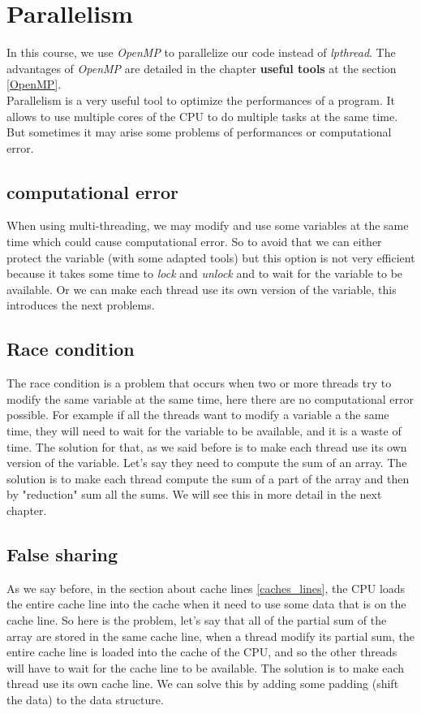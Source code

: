 \documentclass[12pt, openany]{report}
\theoremstyle{definition}
\begin{document}
\section{Parallelism}
In this course, we use \textit{OpenMP} to parallelize our code instead of \textit{lpthread}. The advantages of \textit{OpenMP} are detailed in the chapter \textbf{useful tools} at the section \ref{OpenMP}.\\ 
Parallelism is a very useful tool to optimize the performances of a program. It allows to use multiple cores of the CPU to do multiple tasks at the same time. But sometimes it may arise some problems of performances or computational error.
\subsection{computational error}
When using multi-threading, we may modify and use some variables at the same time which could cause computational error. So to avoid that we can either protect the variable (with some adapted tools) but this option is not very efficient because it takes some time to \textit{lock} and \textit{unlock} and to wait for the variable to be available. Or we can make each thread use its own version of the variable, this introduces the next problems.
\subsection{Race condition}
The race condition is a problem that occurs when two or more threads try to modify the same variable at the same time, here there are no computational error possible. For example if all the threads want to modify a variable a the same time, they will need to wait for the variable to be available, and it is a waste of time. The solution for that, as we said before is to make each thread use its own version of the variable. Let's say they need to compute the sum of an array. The solution is to make each thread compute the sum of a part of the array and then by "reduction" sum all the sums. We will see this in more detail in the next chapter.
\subsection{False sharing}
As we say before, in the section about cache lines \ref{caches_lines}, the CPU loads the entire cache line into the cache when it need to use some data that is on the cache line. So here is the problem, let's say that all of the partial sum of the array are stored in the same cache line, when a thread modify its partial sum, the entire cache line is loaded into the cache of the CPU, and so the other threads will have to wait for the cache line to be available. The solution is to make each thread use its own cache line. We can solve this by adding some padding (shift the data) to the data structure.
\end{document}
